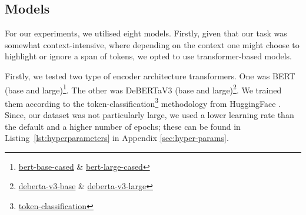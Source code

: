 \documentclass[11pt]{article}
\begin{document}
\begin{table}[h]
\centering
{}
\caption{Analysis of agreement for each annotation category on the 82 double-annotated documents.}
\label{tab:res_labels}
\vspace{-1.5em}
\end{table}






\subsection{Models}
For our experiments, we utilised eight models. Firstly, given that our task was somewhat context-intensive, where depending on the context one might choose to highlight or ignore a span of tokens, we opted to use transformer-based models.

Firstly, we tested two type of encoder architecture transformers. One was BERT \citep{devlin-etal-2019-bert} (base and large)\footnote{\href{https://huggingface.co/google-bert/bert-base-cased}{bert-base-cased} \& \href{https://huggingface.co/google-bert/bert-large-cased}{bert-large-cased}}. The other was DeBERTaV3 \citep{he2021debertav3,he2021deberta} (base and large)\footnote{\href{https://huggingface.co/microsoft/deberta-v3-base}{deberta-v3-base} \& \href{https://huggingface.co/microsoft/deberta-v3-large}{deberta-v3-large}}. We trained them according to the token-classification\footnote{\href{https://github.com/huggingface/transformers/tree/main/examples/pytorch/token-classification}{token-classification}} methodology from HuggingFace \citep{wolf2020huggingfacestransformersstateoftheartnatural}. Since, our dataset was not particularly large, we used a lower learning rate than the default and a higher number of epochs; these can be found in Listing~\ref{lst:hyperparameters} in Appendix \ref{sec:hyper-params}.
\end{document}
